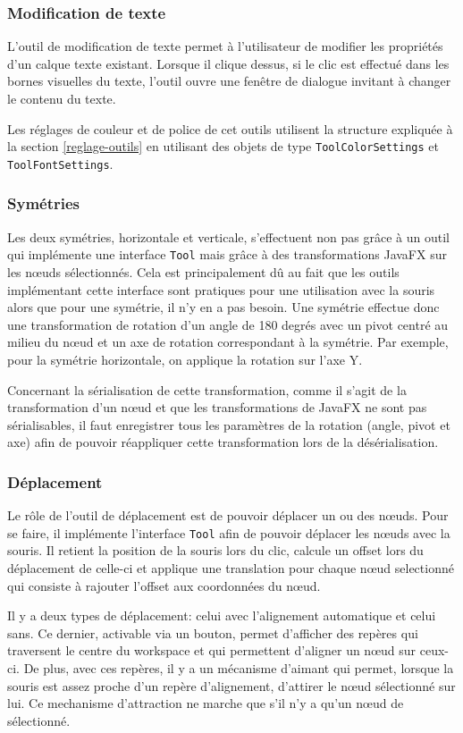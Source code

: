 \subsubsection{Modification de texte}
L'outil de modification de texte permet à l'utilisateur de modifier les propriétés d'un calque texte existant. Lorsque il clique dessus, si le clic est effectué dans les bornes visuelles du texte, l'outil ouvre une fenêtre de dialogue invitant à changer le contenu du texte.
\par
Les réglages de couleur et de police de cet outils utilisent la structure expliquée à la section \ref{reglage-outils} en utilisant des objets de type \texttt{ToolColorSettings} et \texttt{ToolFontSettings}.
\subsubsection{Symétries}

Les deux symétries, horizontale et verticale, s'effectuent non pas grâce à un outil qui implémente une interface \texttt{Tool} mais grâce à des transformations JavaFX sur les n\oe uds sélectionnés. Cela est principalement dû au fait que les outils implémentant cette interface sont pratiques pour une utilisation avec la souris alors que pour une symétrie, il n'y en a pas besoin. Une symétrie effectue donc une transformation de rotation d'un angle de 180 degrés avec un pivot centré au milieu du n\oe ud et un axe de rotation correspondant à la symétrie. Par exemple, pour la symétrie horizontale, on applique la rotation sur l'axe Y.

Concernant la sérialisation de cette transformation, comme il s'agit de la transformation d'un n\oe ud et que les transformations de JavaFX ne sont pas sérialisables, il faut enregistrer tous les paramètres de la rotation (angle, pivot et axe) afin de pouvoir réappliquer cette transformation lors de la désérialisation.
\subsubsection{Déplacement}
Le rôle de l'outil de déplacement est de pouvoir déplacer un ou des n\oe uds. Pour se faire, il implémente l'interface \texttt{Tool} afin de pouvoir déplacer les n\oe uds avec la souris. Il retient la position de la souris lors du clic, calcule un offset lors du déplacement de celle-ci et applique une translation pour chaque n\oe ud selectionné qui consiste à rajouter l'offset aux coordonnées du n\oe ud.

Il y a deux types de déplacement: celui avec l'alignement automatique et celui sans. Ce dernier, activable via un bouton, permet d'afficher des repères qui traversent le centre du workspace et qui permettent d'aligner un n\oe ud sur ceux-ci. De plus, avec ces repères, il y a un mécanisme d'aimant qui permet, lorsque la souris est assez proche d'un repère d'alignement, d'attirer le n\oe ud sélectionné sur lui. Ce mechanisme d'attraction ne marche que s'il n'y a qu'un n\oe ud de sélectionné.
